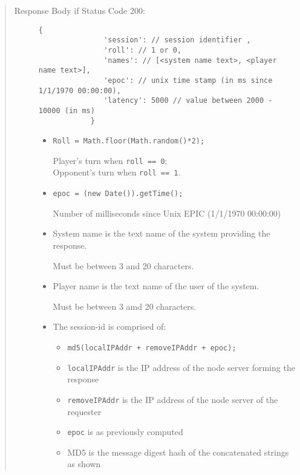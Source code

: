 \documentclass[10pt]{article}
\begin{document}
\begin{quote}
\begin{description}
      \item[Response Body if Status Code 200:]
         \begin{lstlisting}[gobble=12]
            {
               'session': // session identifier ,
               'roll': // 1 or 0,
               'names': // [<system name text>, <player name text>],
               'epoc': // unix time stamp (in ms since 1/1/1970 00:00:00),
               'latency': 5000 // value between 2000 - 10000 (in ms)
            }
         \end{lstlisting}
         \begin{itemize}
            \item \lstinline|Roll = Math.floor(Math.random()*2);|
            
                  Player's turn when \lstinline|roll == 0|; \\
                  Opponent's turn when \lstinline|roll == 1|.
            \item \lstinline|epoc = (new Date()).getTime();| 
            
                  Number of milliseconds since Unix EPIC (1/1/1970 00:00:00)

            \item System name is the text name of the system providing the response.
            
                  Must be between 3 and 20 characters.
            \item Player name is the text name of the user of the system.
            
                  Must be between 3 amd 20 characters.

            \item The session-id is comprised of:
               \begin{itemize}
                  \item \lstinline|md5(localIPAddr + removeIPAddr + epoc);|
                  \item \lstinline|localIPAddr| is the IP address of the node server forming the response
                  \item \lstinline|removeIPAddr| is the IP address of the node server of the requester
                  \item \lstinline|epoc| is as previously computed
                  \item MD5 is the message digest hash of the concatenated strings as shown
               \end{itemize}


\end{itemize}
\end{description}
\end{quote}
\end{document}
